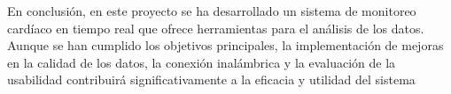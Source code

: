 En conclusión, en este proyecto se ha desarrollado un sistema de monitoreo cardíaco en tiempo real que ofrece herramientas para el análisis de los datos. Aunque se han cumplido los objetivos principales, la implementación de mejoras en la calidad de los datos, la conexión inalámbrica y la evaluación de la usabilidad contribuirá significativamente a la eficacia y utilidad del sistema
